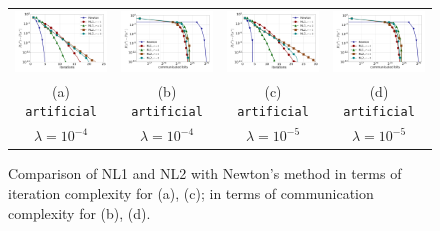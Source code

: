 \documentclass[10pt]{article}
\begin{document}
\begin{figure}[ht]
	\vskip 0.2in
	\begin{center}
		\begin{tabular}{cccc}
			\includegraphics[width = 0.23 \textwidth]{LogReg/artificial/Lambda=1e-4/artificial_nm_nl1_nl2_iter_lmb=0.0001.pdf}&
			\includegraphics[width = 0.23 \textwidth]{LogReg/artificial/Lambda=1e-4/artificial_nm_nl1_nl2_bits_lmb=0.0001.pdf}&	
			\includegraphics[width = 0.23 \textwidth]{LogReg/artificial/Lambda=1e-5/artificial_nm_nl1_nl2_iter_lmb=0.00001.pdf}&
			\includegraphics[width = 0.23 \textwidth]{LogReg/artificial/Lambda=1e-4/artificial_nm_nl1_nl2_bits_lmb=0.0001.pdf}\\
			(a) {\tt artificial} & (b) {\tt artificial} & (c) {\tt artificial} & (d) {\tt artificial}\\
			$\lambda=10^{-4}$ & $\lambda=10^{-4}$ & $\lambda=10^{-5}$ & $\lambda=10^{-5}$\\
		\end{tabular}
		\caption{Comparison of {\sf NL1} and {\sf NL2} with Newton's method in terms of iteration complexity for (a), (c); in terms of communication complexity for (b), (d).}
		\label{a9a:alg1_alg2}
	\end{center}
\end{figure}
\end{document}
